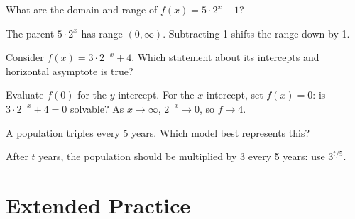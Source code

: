 \documentclass{ximera}
\begin{document}
\begin{problem}
What are the domain and range of $f(x) = 5\cdot 2^x - 1$?
\begin{hint}
The parent $5\cdot 2^x$ has range $(0,\infty)$. Subtracting 1 shifts the range down by 1.
\end{hint}
\begin{multipleChoice}
  \choice{Domain: $(-\infty,\infty)$;\quad Range: $[0,\infty)$}
\end{multipleChoice}
\end{problem}

\begin{problem}
Consider $f(x) = 3\cdot 2^{-x}+4$. Which statement about its intercepts and horizontal asymptote is true?
\begin{hint}
Evaluate $f(0)$ for the $y$-intercept. For the $x$-intercept, set $f(x)=0$: is $3\cdot 2^{-x}+4=0$ solvable? As $x\to\infty$, $2^{-x}\to0$, so $f\to4$.
\end{hint}
\begin{multipleChoice}
\end{multipleChoice}
\end{problem}

\begin{problem}
A population triples every 5 years. Which model best represents this?
\begin{hint}
After $t$ years, the population should be multiplied by 3 every 5 years: use $3^{t/5}$.
\end{hint}
\begin{multipleChoice}
\end{multipleChoice}
\end{problem}


\bigskip
\section*{Extended Practice}
\end{document}
